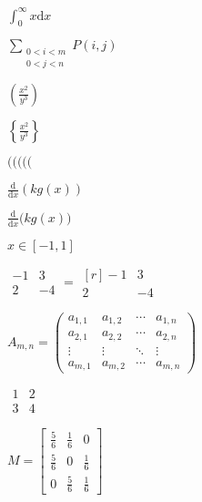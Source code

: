 \documentclass{article}
\begin{document}
$ \int_0^\infty x\mathrm{d}x $


$
\sum_{\substack{
    0<i<m \\
    0<j<n
    }}
P(i,j)
$


$ \left(\frac{x^2}{y^3}\right) $


$ \left\{\frac{x^2}{y^3}\right\} $



$ ( \big( \Big( \bigg( \Bigg( $

$ \frac{\mathrm d}{\mathrm d x} \left( k g(x) \right) $

$ \frac{\mathrm d}{\mathrm d x} \big( k g(x) \big) $

$ x \in [-1, 1] $

$
\begin{matrix}
    -1 & 3 \\
    2 & -4
\end{matrix}
=
\begin{matrix*}[r]
    -1 & 3 \\
    2 & -4
\end{matrix*}
$

$
A_{m,n} =
\begin{pmatrix}
    a_{1,1} & a_{1,2} & \cdots & a_{1,n} \\
    a_{2,1} & a_{2,2} & \cdots & a_{2,n} \\
    \vdots  & \vdots  & \ddots & \vdots  \\
    a_{m,1} & a_{m,2} & \cdots & a_{m,n}
\end{pmatrix}
$

$
\begin{array}{cc}
1 & 2 \\
\hline
3 & 4
\end{array}
$

$
M = \begin{bmatrix}
    \frac{5}{6} & \frac{1}{6} & 0           \\[0.3em]
    \frac{5}{6} & 0           & \frac{1}{6} \\[0.3em]
    0           & \frac{5}{6} & \frac{1}{6}
    \end{bmatrix}
$

\begin{comment}
$
M = \bordermatrix{~ & x & y \cr
                   A & 1 & 0 \cr
                   B & 0 & 1 \cr}

$
\end{comment}
\end{document}
